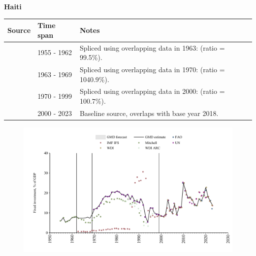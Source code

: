 \documentclass[12pt,a4paper,landscape]{article}
\begin{document}
\begin{adjustbox}{max totalsize={\paperwidth}{\paperheight},center}
\begin{minipage}[t][\textheight][t]{\textwidth}
\vspace*{0.5cm}
{}
\begin{center}
{\Large\bfseries Haiti}
\end{center}
\vspace{0.5cm}
\begin{table}[H]
\centering
\small
\begin{tabular}{|l|l|l|}
\hline
\textbf{Source} & \textbf{Time span} & \textbf{Notes} \\
\hline
\rowcolor{white}\cite{Mitchell}& 1955 - 1962 &Spliced using overlapping data in 1963: (ratio = 99.5\%).\\
\rowcolor{lightgray}\cite{IMF_IFS}& 1963 - 1969 &Spliced using overlapping data in 1970: (ratio = 1040.9\%).\\
\rowcolor{white}\cite{UN}& 1970 - 1999 &Spliced using overlapping data in 2000: (ratio = 100.7\%).\\
\rowcolor{lightgray}\cite{WDI}& 2000 - 2023 &Baseline source, overlaps with base year 2018.\\
\hline
\end{tabular}
\end{table}
\begin{figure}[H]
\centering
\includegraphics[width=\textwidth,height=0.6\textheight,keepaspectratio]{graphs/HTI_finv_GDP.pdf}
\end{figure}
\end{minipage}
\end{adjustbox}
\end{document}

